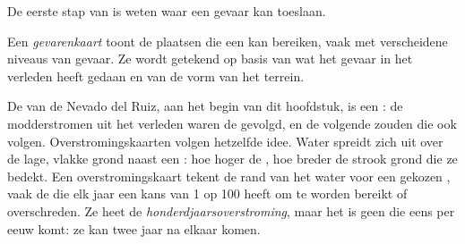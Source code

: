 De eerste stap van  is weten waar een gevaar kan toeslaan.

\begin{definition}[Gevarenkaart]\label{def:g9:natural-risks:hazard-map}
Een \emph{gevarenkaart} toont de plaatsen die een
 kan bereiken, vaak met verscheidene niveaus van gevaar. Ze
wordt getekend op basis van wat het gevaar in het verleden heeft gedaan en
van de vorm van het terrein.
\end{definition}

De  van de Nevado del Ruiz, aan het begin van dit hoofdstuk, is een
: de modderstromen uit het verleden waren de  gevolgd, en
de volgende zouden die ook volgen. Overstromingskaarten volgen hetzelfde
idee. Water spreidt zich uit over de lage, vlakke grond naast een :
hoe hoger de , hoe breder de strook grond die ze bedekt. Een
overstromingskaart tekent de rand van het water voor een gekozen
, vaak de  die elk jaar een kans van 1 op 100
heeft om te worden bereikt of overschreden. Ze heet de
\emph{honderdjaarsoverstroming}, maar het is geen  die eens
per eeuw komt: ze kan twee jaar na elkaar komen.

